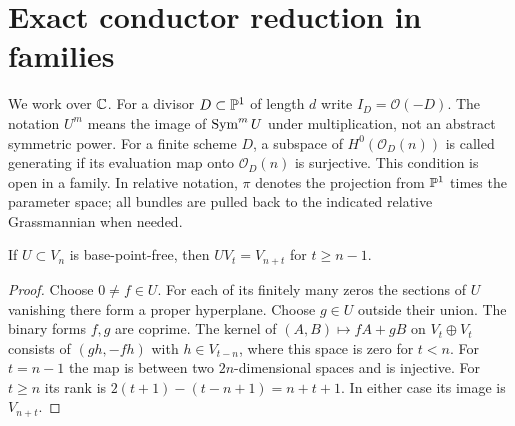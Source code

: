 \section{Exact conductor reduction in families}
\label{sec:conductor-reduction}
We work over $\mathbb C$. For a divisor $D\subset\mathbb P^1$ of length $d$
write $I_D=\mathcal O(-D)$. The notation $U^m$ means the image of
$\operatorname{Sym}^m U$ under multiplication, not an abstract symmetric power.
For a finite scheme $D$, a subspace of $H^0(\mathcal O_D(n))$ is
called generating if its evaluation map onto $\mathcal O_D(n)$ is
surjective. This condition is open in a family. In relative notation, $\pi$ denotes
the projection from $\mathbb P^1$ times the parameter space; all bundles
are pulled back to the indicated relative Grassmannian when needed.

\begin{lemma}\label{lem:conductor-pencil}
If $U\subset V_n$ is base-point-free, then
$UV_t=V_{n+t}$ for $t\ge n-1$.
\end{lemma}
\begin{proof}
Choose $0\ne f\in U$. For each of its finitely many zeros the
sections of $U$ vanishing there form a proper hyperplane. Choose
$g\in U$ outside their union. The binary forms $f,g$ are coprime.
The kernel of $(A,B)\mapsto fA+gB$ on $V_t\oplus V_t$ consists
of $(gh,-fh)$ with $h\in V_{t-n}$, where this space is zero for
$t<n$. For $t=n-1$ the map is between two $2n$-dimensional spaces
and is injective. For $t\ge n$ its rank is
$2(t+1)-(t-n+1)=n+t+1$. In either case its image is $V_{n+t}$.
\end{proof}


